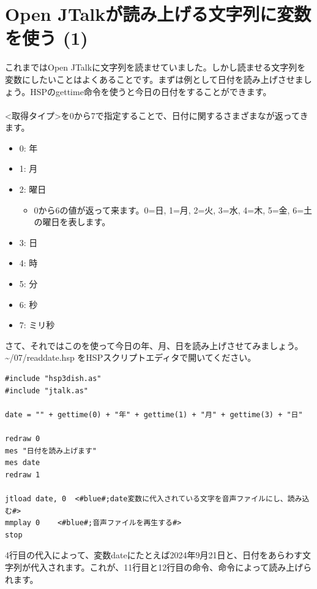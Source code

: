 \documentclass[text06.tex]{subfiles}
\begin{document}
\newpage
\section{Open JTalkが読み上げる文字列に変数を使う (1)}
これまではOpen JTalkに文字列を読ませていました。しかし読ませる文字列を変数にしたいことはよくあることです。まずは例として日付を読み上げさせましょう。HSPのgettime命令を使うと今日の日付をすることができます。\\
\\
<取得タイプ>を0から7で指定することで、日付に関するさまざまなが返ってきます。
\begin{itemize}
\item 0: 年
\item 1: 月
\item 2: 曜日
\begin{itemize}
 \item 0から6の値が返って来ます。0=日, 1=月, 2=火, 3=水, 4=木, 5=金, 6=土 の曜日を表します。
\end{itemize}
\item 3: 日
\item 4: 時
\item 5: 分
\item 6: 秒
\item 7: ミリ秒
\end{itemize}
さて、それではこのを使って今日の年、月、日を読み上げさせてみましょう。 \textasciitilde /07/\mbox{readdate.hsp} をHSPスクリプトエディタで開いてください。\\

\begin{lstlisting}[caption=readdate.hsp,label=readdate.hsp]
#include "hsp3dish.as"
#include "jtalk.as"

date = "" + gettime(0) + "年" + gettime(1) + "月" + gettime(3) + "日"

redraw 0
mes "日付を読み上げます"
mes date
redraw 1

jtload date, 0	<#blue#;date変数に代入されている文字を音声ファイルにし、読み込む#>
mmplay 0	<#blue#;音声ファイルを再生する#>
stop
\end{lstlisting}

4行目の代入によって、変数dateにたとえば2024年9月21日と、日付をあらわす文字列が代入されます。これが、11行目と12行目の命令、命令によって読み上げられます。\\

\begin{tcolorbox}[title=\useOmetoi]
\begin{enumerate}
\end{enumerate}
\end{tcolorbox}
\end{document}
